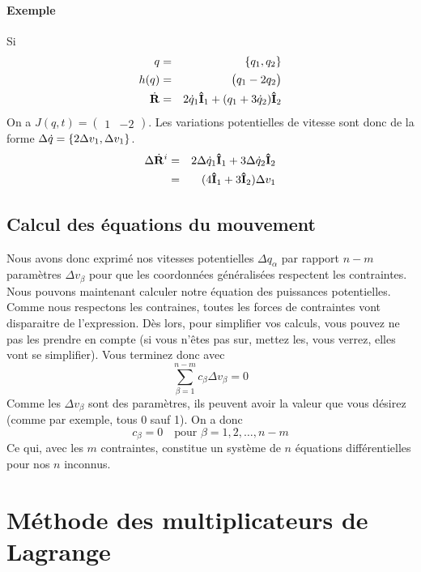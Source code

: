 \paragraph{Exemple}
Si
\begin{eqnarray*}
	q &=& \{q_1, q_2\}\\
	h(q) &=& \begin{pmatrix}q_1 - 2q_2\end{pmatrix}\\
	\dot{\bf R} &=& 2\dot{q}_1 {\bf\hat{I}}_1 + (q_1 + 3\dot{q}_2) {\bf\hat{I}}_2
\end{eqnarray*}
On a $J(q, t) = \begin{pmatrix}1 & -2\end{pmatrix}$.
Les variations potentielles de vitesse sont donc de la forme $\Delta \dot{q} = \{2\Delta v_1, \Delta v_1\}$.
\begin{eqnarray*}
	\Delta \dot{\bf R}^i &=& 2 \Delta \dot{q}_1 {\bf\hat{I}}_1 + 3 \Delta \dot{q}_2 {\bf\hat{I}}_2\\
	&=& (4{\bf\hat{I}}_1 + 3{\bf\hat{I}}_2) \Delta v_1
\end{eqnarray*}


\subsection{Calcul des équations du mouvement}
Nous avons donc exprimé nos vitesses potentielles $\Delta q_\alpha$ par rapport $n - m$ paramètres $\Delta v_\beta$ pour que les coordonnées généralisées respectent les contraintes.
Nous pouvons maintenant calculer notre équation des puissances potentielles.
Comme nous respectons les contraines, toutes les forces de contraintes vont disparaitre de l'expression.
Dès lors, pour simplifier vos calculs, vous pouvez ne pas les prendre en compte (si vous n'êtes pas sur, mettez les, vous verrez, elles vont se simplifier).
Vous terminez donc avec
\[ \sum_{\beta = 1}^{n - m} c_\beta \Delta v_\beta = 0 \]
Comme les $\Delta v_\beta$ sont des paramètres, ils peuvent avoir la valeur que vous désirez
(comme par exemple, tous 0 sauf 1).
On a donc
\[ c_\beta = 0 \quad \text{pour }\beta = 1, 2, \ldots, n-m \]
Ce qui, avec les $m$ contraintes, constitue un système de $n$ équations différentielles pour nos $n$ inconnus.

\section{Méthode des multiplicateurs de Lagrange}

